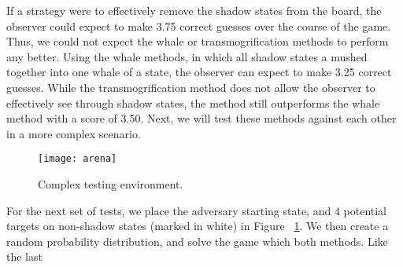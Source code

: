 If a strategy were to effectively remove the shadow states from the board, the observer could expect to make 3.75 correct guesses over the course of the game. Thus, we could not expect the whale or transmogrification methods to perform any better. Using the whale methods, in which all shadow states a mushed together into one whale of a state, the observer can expect to make 3.25 correct guesses. While the transmogrification method does not allow the observer to effectively see through shadow states, the method still outperforms the whale method with a score of 3.50. Next, we will test these methods against each other in a more complex scenario.  

\begin{figure}[h!]
\begin{center}

  \texttt{[image: arena]}
  \end{center}

  \caption{Complex testing environment.}
  
  \label{fig:arena}
\end{figure}

For the next set of tests, we place the adversary starting state, and 4 potential targets on non-shadow states (marked in white) in Figure ~\ref{fig:arena}. We then create a random probability distribution, and solve the game which both methods. Like the last 

\nocite{Dijkstra80}
\nocite{plop03-paper}
